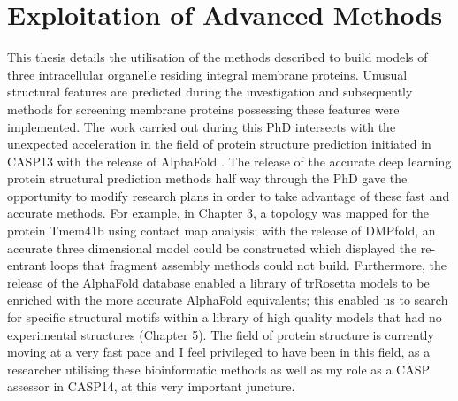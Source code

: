 \section{Exploitation of Advanced Methods}
This thesis details the utilisation of the methods described to build models of three intracellular organelle residing integral membrane proteins.  Unusual structural features are predicted during the investigation and subsequently methods for screening membrane proteins possessing these features were implemented. The work carried out during this PhD intersects with the unexpected acceleration in the field of protein structure prediction initiated in CASP13 with the release of AlphaFold \cite{Jumper2021}. The release of the accurate deep learning protein structural prediction methods half way through the PhD gave the opportunity to modify research plans in order to take advantage of these fast and accurate methods.  For example, in Chapter 3, a topology was mapped for the protein Tmem41b using contact map analysis; with the release of DMPfold, an accurate three dimensional model could be constructed which displayed the re-entrant loops that fragment assembly methods could not build.  Furthermore, the release of the AlphaFold database \cite{david2022alphafold} enabled a library of trRosetta models to be enriched with the more accurate AlphaFold equivalents; this enabled us to search for specific structural motifs within a library of high quality models that had no experimental structures (Chapter 5).  The field of protein structure is currently moving at a very fast pace and I feel privileged to have been in this field, as a researcher utilising these bioinformatic methods as well as my role as a CASP assessor in CASP14, at this very important juncture.   
